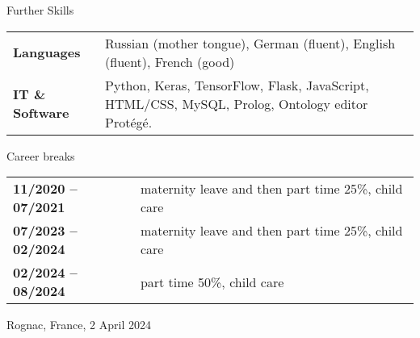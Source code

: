 \documentclass{resume} %
\begin{document}
\vspace{-10pt}

\begin{rSection}{Further Skills} 

\hspace{-20pt}
\begin{tabular}{p{3.8cm}p{13cm}}

{\bf Languages} &  Russian (mother tongue), German (fluent), English (fluent), French (good) \\[5pt]
{\bf IT \& Software} &  Python, Keras, TensorFlow, Flask, JavaScript, HTML/CSS, MySQL, Prolog, Ontology editor Prot\'eg\'e.

 
\end{tabular}

\end{rSection}

\vspace{-10pt}

\begin{rSection}{Career breaks}
	
	\hspace{-20pt}
	\begin{tabular}{p{3.8cm}p{13cm}}
		{\bf 11/2020 -- 07/2021 } & maternity leave and then part time 25\%, child care  \\[5pt]
		{\bf 07/2023 -- 02/2024 } & maternity leave and then part time 25\%, child care  \\[5pt]
		{\bf 02/2024 -- 08/2024 } & part time 50\%, child care  \\[5pt]
	\end{tabular}
\end{rSection}
\bigskip

\bigskip

Rognac, France, 2 April 2024
\end{document}
